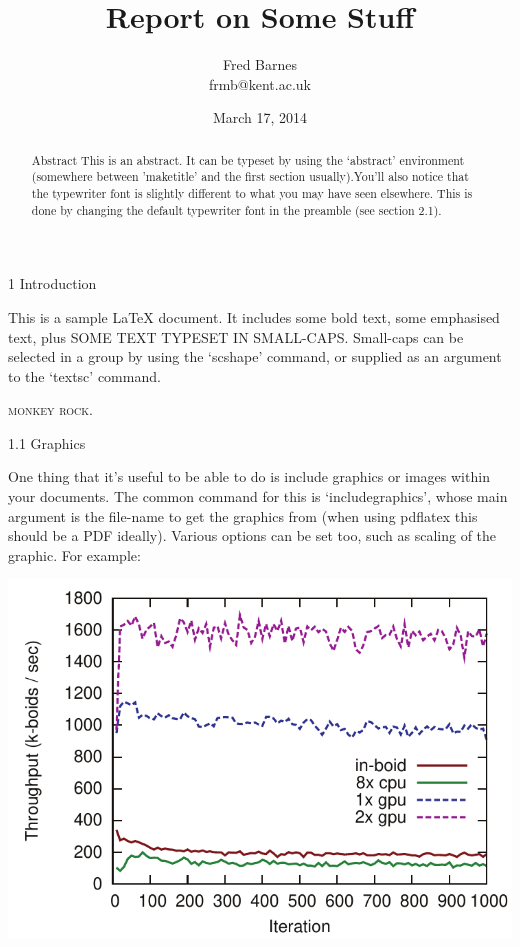 \documentclass[a4paper,12pt]{article}
\begin{document}
\title{Report on Some Stuff}
\author{Fred Barnes \\ frmb@kent.ac.uk}

\date{March 17, 2014}
\maketitle
\begin{abstract}
Abstract
This is an abstract. It can be typeset by using the `abstract' environment
(somewhere between 'maketitle' and the first section usually).You'll also
notice that the typewriter font is slightly different to what you may have 
seen elsewhere. This is done by changing the default typewriter
font in the preamble (see section 2.1).
\end{abstract}


1 Introduction

This is a sample LaTeX document. It includes some bold text, some emphasised
text, plus SOME TEXT TYPESET IN SMALL-CAPS. Small-caps can be selected
in a group by using the `scshape' command, or supplied as an argument to the
`textsc' command.

\textsc{monkey rock}.

1.1 Graphics

One thing that it's useful to be able to do is include graphics or images within
your documents. The common command for this is `includegraphics', whose
main argument is the file-name to get the graphics from (when using pdflatex this
should be a PDF ideally). Various options can be set too, such as scaling of the
graphic. For example:

\includegraphics[scale=0.5]{samplegraph1.pdf}
\end{document}
